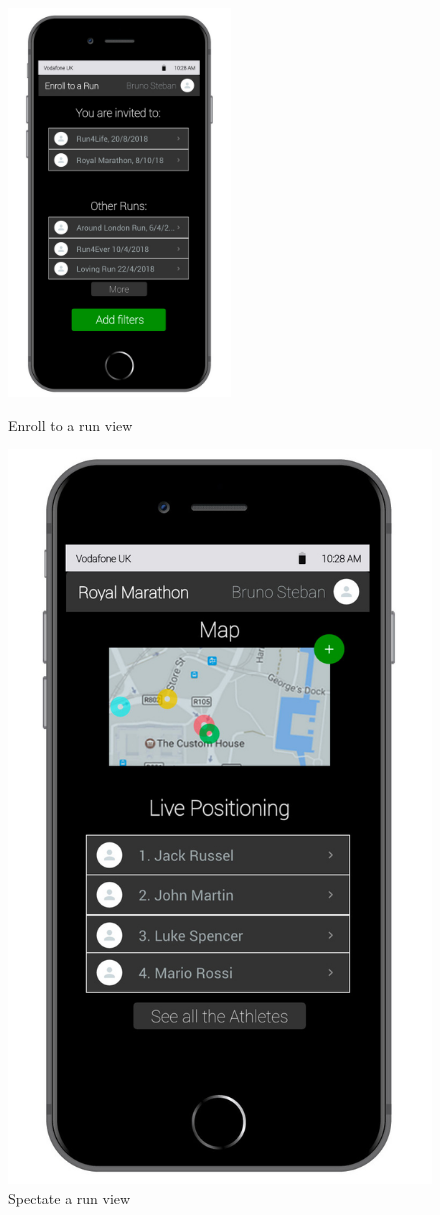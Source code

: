 \begin{enumerate}
\begin{figure}[H]
\begin{center}
\begin{minipage}[c]{.40\textwidth}
        \end{minipage}
      \end{center}
\end{figure}
\begin{figure}[H]
\begin{center}
        \begin{minipage}[c]{.40\textwidth}
        \centering
          \includegraphics[height=10.3cm]{Images/Mockups/Track4RunMockup7.jpg}
	\caption{Enroll to a run view}
        \end{minipage}%
        \hspace{10mm}%
        \begin{minipage}[c]{.40\textwidth}
        \centering
          \includegraphics[height=10.3 cm]{Images/Mockups/Track4RunMockup8.jpg}
	\caption{Spectate a run view}
        \end{minipage}
      \end{center}
\end{figure}
\end{enumerate}

